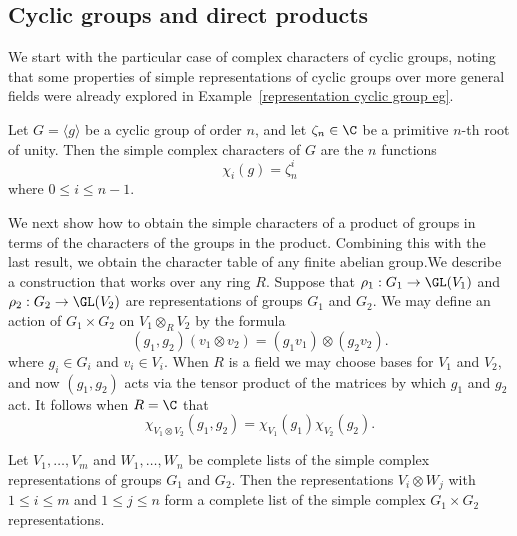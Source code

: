 \subsection{Cyclic groups and direct products}
We start with the particular case of complex characters of cyclic groups, noting that some properties of simple representations of cyclic groups over more general fields were already explored in Example~\ref{representation cyclic group eg}.
\begin{proposition}
Let $G=\langle g\rangle$ be a cyclic group of order $n$, and let $\zeta_n\in\C$ be a primitive $n$-th root of unity. Then the simple complex characters of $G$ are the $n$ functions
\[\chi_i(g)=\zeta_{n}^{i}\]
where $0\leq i\leq n-1$.
\end{proposition}
We next show how to obtain the simple characters of a product of groups in
terms of the characters of the groups in the product. Combining this with the last result, we obtain the character table of any finite abelian group.We describe a construction that works over any ring $R$. Suppose that $\rho_1:G_1\to\GL(V_1)$ and $\rho_2:G_2\to\GL(V_2)$ are representations of groups $G_1$ and $G_2$. We may define an action of $G_1\times G_2$ on $V_1\otimes_RV_2$ by the formula
\[(g_1,g_2)(v_1\otimes v_2)=(g_1v_1)\otimes(g_2v_2).\]
where $g_i\in G_i$ and $v_i\in V_i$. When $R$ is a field we may choose bases for $V_1$ and $V_2$, and now $(g_1,g_2)$ acts via the tensor product of the matrices by which $g_1$ and $g_2$ act. It follows when $R=\C$ that
\[\chi_{V_1\otimes V_2}(g_1,g_2)=\chi_{V_1}(g_1)\chi_{V_2}(g_2).\]
\begin{theorem}
Let $V_1,\dots,V_m$ and $W_1,\dots,W_n$ be complete lists of the simple complex representations of groups $G_1$ and $G_2$. Then the representations $V_i\otimes W_j$ with $1\leq i\leq m$ and $1\leq j\leq n$ form a complete list of the simple complex $G_1\times G_2$ representations.
\end{theorem}
